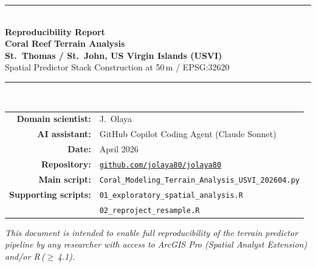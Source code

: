 \documentclass[11pt, a4paper]{article}
\begin{document}
\begin{titlepage}
  \centering
  \vspace*{2cm}

  {\color{coralblue}\rule{\linewidth}{1.5pt}}\\[0.4cm]

  {\LARGE\bfseries\color{coralblue}
    Reproducibility Report\\[0.3em]
    Coral Reef Terrain Analysis\\[0.3em]
    St.\ Thomas / St.\ John, US Virgin Islands (USVI)
  }\\[0.4cm]

  {\large\color{darkgray}
    Spatial Predictor Stack Construction at 50\,m / EPSG:32620
  }\\[0.3cm]

  {\color{coralblue}\rule{\linewidth}{1.5pt}}\\[1.5cm]

  \begin{tabular}{rl}
    \textbf{Domain scientist:}  & J.\ Olaya \\[4pt]
    \textbf{AI assistant:}      & GitHub Copilot Coding Agent (Claude Sonnet) \\[4pt]
    \textbf{Date:}              & April 2026 \\[4pt]
    \textbf{Repository:}        & \href{https://github.com/jolaya80/jolaya80}%
                                       {\texttt{github.com/jolaya80/jolaya80}} \\[4pt]
    \textbf{Main script:}       & \texttt{Coral\_Modeling\_Terrain\_Analysis\_USVI\_202604.py} \\[4pt]
    \textbf{Supporting scripts:}& \texttt{01\_exploratory\_spatial\_analysis.R} \\
                                & \texttt{02\_reproject\_resample.R} \\
  \end{tabular}

  \vfill

  {\small\color{darkgray}
    \textit{This document is intended to enable full reproducibility of the
    terrain predictor pipeline by any researcher with access to ArcGIS Pro
    (Spatial Analyst Extension) and/or R\,($\geq$\,4.1).}
  }
\end{titlepage}

\end{document}
